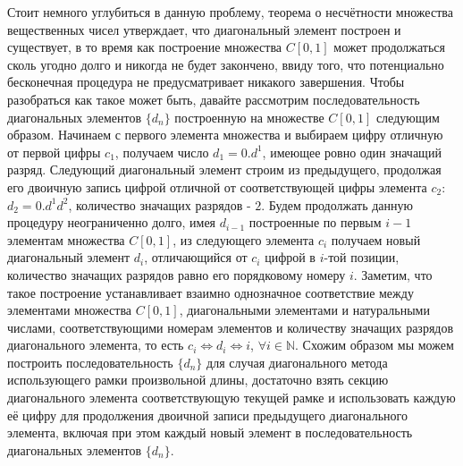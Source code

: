 \documentclass[12pt]{article}
\begin{document}
Стоит немного углубиться в данную проблему, теорема о несчётности множества вещественных чисел утверждает, что диагональный элемент построен и существует, в то время как построение множества $C[0, 1]$ может продолжаться сколь угодно долго и никогда не будет закончено, ввиду того, что потенциально бесконечная процедура не предусматривает никакого завершения. Чтобы разобраться как такое может быть, давайте рассмотрим последовательность диагональных элементов $\{d_n\}$ построенную на множестве $C[0, 1]$ следующим образом. Начинаем с первого элемента множества и выбираем цифру отличную от первой цифры $c_1$, получаем число $d_1 = 0.d^1$, имеющее ровно один значащий разряд. Следующий диагональный элемент строим из предыдущего, продолжая его двоичную запись цифрой отличной от соответствующей цифры элемента $c_2$: $d_2 = 0.d^1d^2$, количество значащих разрядов - $2$. Будем продолжать данную процедуру неограниченно долго, имея $d_{i - 1}$ построенные по первым $i - 1$ элементам множества $C[0, 1]$, из следующего элемента $c_i$ получаем новый диагональный элемент $d_i$, отличающийся от $c_i$ цифрой в $i$-той позиции, количество значащих разрядов равно его порядковому номеру $i$. Заметим, что такое построение устанавливает взаимно однозначное соответствие между элементами множества $C[0, 1]$, диагональными элементами и натуральными числами, соответствующими номерам элементов и количеству значащих разрядов диагонального элемента, то есть $c_i \Leftrightarrow d_i \Leftrightarrow i$, $\forall i \in \mathbb{N}$. Схожим образом мы можем построить последовательность $\{d_n\}$ для случая диагонального метода использующего рамки произвольной длины, достаточно взять секцию диагонального элемента соответствующую текущей рамке и использовать каждую её цифру для продолжения двоичной записи предыдущего диагонального элемента, включая при этом каждый новый элемент в последовательность диагональных элементов $\{d_n\}$.
\end{document}
